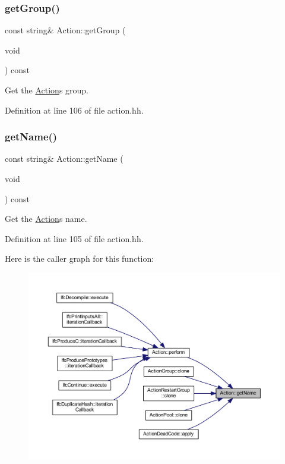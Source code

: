 \subsubsection{\texorpdfstring{getGroup()}{getGroup()}}
{\footnotesize\ttfamily const string\& Action\+::get\+Group (\begin{DoxyParamCaption}\item[{void}]{ }\end{DoxyParamCaption}) const\hspace{0.3cm}{\ttfamily [inline]}}



Get the \mbox{\hyperlink{class_action}{Action}}\textquotesingle{}s group. 



Definition at line 106 of file action.\+hh.

\mbox{\label{class_action_a0db87bda6499163fe29bae6c33383c5b}} 
\subsubsection{\texorpdfstring{getName()}{getName()}}
{\footnotesize\ttfamily const string\& Action\+::get\+Name (\begin{DoxyParamCaption}\item[{void}]{ }\end{DoxyParamCaption}) const\hspace{0.3cm}{\ttfamily [inline]}}



Get the \mbox{\hyperlink{class_action}{Action}}\textquotesingle{}s name. 



Definition at line 105 of file action.\+hh.

Here is the caller graph for this function\+:
\nopagebreak
\begin{figure}[H]
\begin{center}
\leavevmode
\includegraphics[width=350pt]{class_action_a0db87bda6499163fe29bae6c33383c5b_icgraph}
\end{center}
\end{figure}
\mbox{\label{class_action_aa0251eaca46502e85d3c691691855c3e}} 
